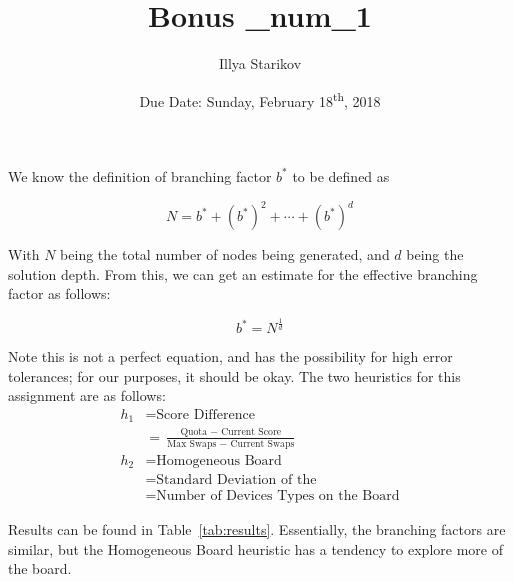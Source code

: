 \documentclass[12pt]{scrartcl}
\title{Bonus \_num_1}
\date{Due Date: Sunday, February 18\textsuperscript{th}, 2018}
\author{Illya Starikov}
\begin{document}
\maketitle

We know the definition of branching factor $b^*$ to be defined as

\begin{equation*}
    N = b^* + {(b^*)}^2 + \cdots + {(b^*)}^d
\end{equation*}

With $N$ being the total number of nodes being generated, and $d$ being the solution depth. From this, we can get an estimate for the effective branching factor as follows:

\begin{equation*}
    b^* = N^{\frac{1}{d}}
\end{equation*}

Note this is not a perfect equation, and has the possibility for high error tolerances; for our purposes, it should be okay. The two heuristics for this assignment are as follows:
\begin{align*}
    h_1 &= \text{Score Difference} \\
        &= \frac{\text{Quota $-$ Current Score}}{\text{Max Swaps $-$ Current Swaps}} \\
    h_2 &= \text{Homogeneous Board} \\
        &= \text{Standard Deviation of the} \\
        &= \text{Number of Devices Types on the Board}
\end{align*}


Results can be found in Table~\ref{tab:results}. Essentially, the branching factors are similar, but the Homogeneous Board heuristic has a tendency to explore more of the board.

\begin{table}[H]
    \centering
    \caption{The computations for the effective branching factor.}
    \label{tab:results}
\end{table}
\end{document}
